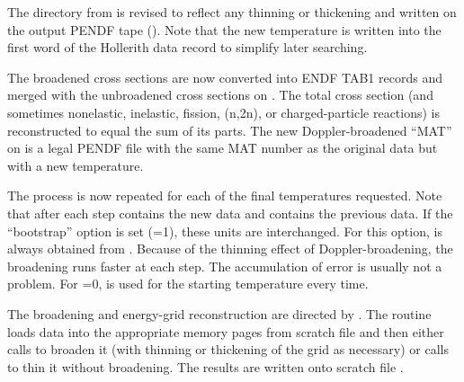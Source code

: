The directory from  is revised to reflect any thinning
or thickening and written on the output PENDF tape ().
Note that the new temperature is written into the first word of the
Hollerith data record to simplify later searching.

The broadened cross sections are now converted into ENDF TAB1
 records and merged with the unbroadened
cross sections on .  The total cross section (and
sometimes nonelastic, inelastic, fission, (n,2n), or
charged-particle reactions) is reconstructed to equal the
sum of its parts.  The new
Doppler-broadened ``MAT'' on  is a legal PENDF file
with the same MAT number as the original data but with a
new temperature.

The process is now repeated for each of the  final
temperatures  requested.  Note that after each step
 contains the new data and  contains the
previous data.  If the ``bootstrap'' option is set
(=1), these units are interchanged.  For this
option,  is always obtained from
.  Because of the thinning effect of
Doppler-broadening, the broadening runs faster at each step.  The
accumulation of error is usually not a problem.  For
=0,  is used for the starting
temperature every time.

The broadening and energy-grid reconstruction are directed by
 .  The routine loads data
into the appropriate memory pages from scratch file  and
then either calls 
to broaden it (with thinning or thickening of the grid as necessary)
or calls  to thin
it without broadening.  The results are written onto scratch file
.

